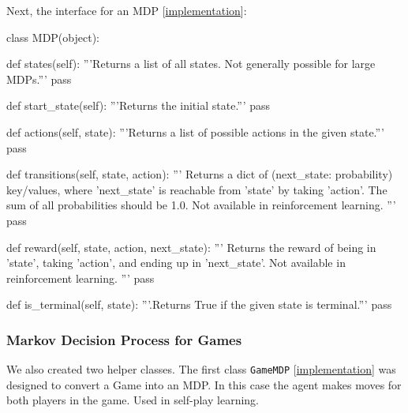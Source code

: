 \documentclass{article}
\newcommand{\GithubURL}[1]{[\href{https://github.com/davidrobles/mlnd-capstone-code/blob/master/#1}{implementation}]}
\begin{document}
Next, the interface for an MDP \GithubURL{capstone/rl/mdp.py\#L7}:

\begin{python}
class MDP(object):

    def states(self):
        '''Returns a list of all states. Not generally possible for large MDPs.'''
        pass

    def start_state(self):
        '''Returns the initial state.'''
        pass

    def actions(self, state):
        '''Returns a list of possible actions in the given state.'''
        pass

    def transitions(self, state, action):
        '''
        Returns a dict of (next_state: probability) key/values, where 'next_state' is
        reachable from 'state' by taking 'action'. The sum of all probabilities should
        be 1.0. Not available in reinforcement learning.
        '''
        pass

    def reward(self, state, action, next_state):
        '''
        Returns the reward of being in 'state', taking 'action', and ending up
        in 'next_state'. Not available in reinforcement learning.
        '''
        pass

    def is_terminal(self, state):
        '''.Returns True if the given state is terminal.'''
        pass
\end{python}

\subsubsection{Markov Decision Process for Games}

We also created two helper classes. The first class \texttt{GameMDP}
\GithubURL{capstone/rl/mdp.py\#L66} was designed to convert a Game into an MDP. In this case the
agent makes moves for both players in the game. Used in self-play learning.
\end{document}
